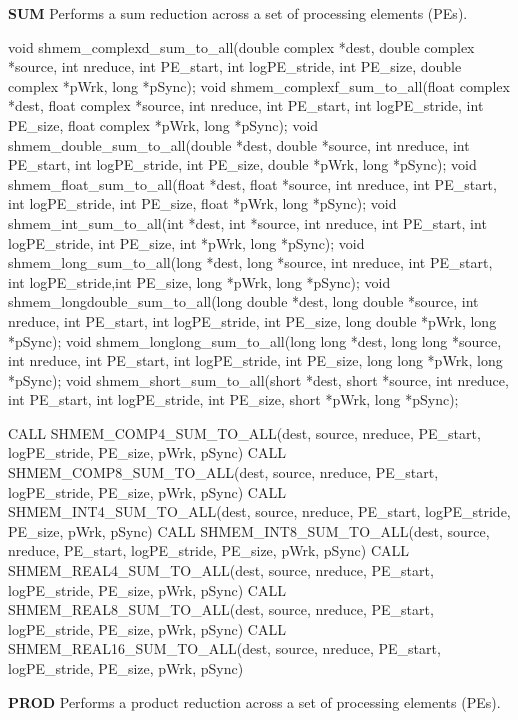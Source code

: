 \bigskip
\textbf{SUM} \newline
Performs a sum reduction across a set of processing elements (\ac{PE}s).\newline
\synC %

void shmem_complexd_sum_to_all(double complex *dest, double complex *source, int nreduce, int PE_start, int logPE_stride, int PE_size, double complex *pWrk, long *pSync);
void shmem_complexf_sum_to_all(float complex *dest, float complex *source, int nreduce, int PE_start, int logPE_stride, int PE_size, float complex *pWrk, long *pSync);
void shmem_double_sum_to_all(double *dest, double *source, int nreduce, int PE_start, int logPE_stride, int PE_size, double *pWrk, long *pSync);
void shmem_float_sum_to_all(float *dest, float *source, int nreduce, int PE_start, int logPE_stride, int PE_size, float *pWrk, long *pSync);
void shmem_int_sum_to_all(int *dest, int *source, int nreduce, int PE_start, int logPE_stride, int PE_size, int *pWrk, long *pSync);
void shmem_long_sum_to_all(long *dest, long *source, int nreduce, int PE_start, int logPE_stride,int PE_size, long *pWrk, long *pSync);
void shmem_longdouble_sum_to_all(long double *dest, long double *source, int nreduce, int PE_start, int logPE_stride, int PE_size, long double *pWrk, long *pSync);
void shmem_longlong_sum_to_all(long long *dest, long long *source, int nreduce, int PE_start, int logPE_stride, int PE_size, long long *pWrk, long *pSync);
void shmem_short_sum_to_all(short *dest, short *source, int nreduce, int PE_start, int logPE_stride, int PE_size, short *pWrk, long *pSync);
\synF %

CALL SHMEM_COMP4_SUM_TO_ALL(dest, source, nreduce, PE_start, logPE_stride, PE_size, pWrk, pSync)
CALL SHMEM_COMP8_SUM_TO_ALL(dest, source, nreduce, PE_start, logPE_stride, PE_size, pWrk, pSync)
CALL SHMEM_INT4_SUM_TO_ALL(dest, source, nreduce, PE_start, logPE_stride, PE_size, pWrk, pSync)
CALL SHMEM_INT8_SUM_TO_ALL(dest, source, nreduce, PE_start, logPE_stride, PE_size, pWrk, pSync)
CALL SHMEM_REAL4_SUM_TO_ALL(dest, source, nreduce, PE_start, logPE_stride, PE_size, pWrk, pSync)
CALL SHMEM_REAL8_SUM_TO_ALL(dest, source, nreduce, PE_start, logPE_stride, PE_size, pWrk, pSync)
CALL SHMEM_REAL16_SUM_TO_ALL(dest, source, nreduce, PE_start, logPE_stride, PE_size, pWrk, pSync)

\bigskip
\textbf{PROD} \newline
Performs a product reduction across a set of processing elements (\ac{PE}s).\newline
\synC %

